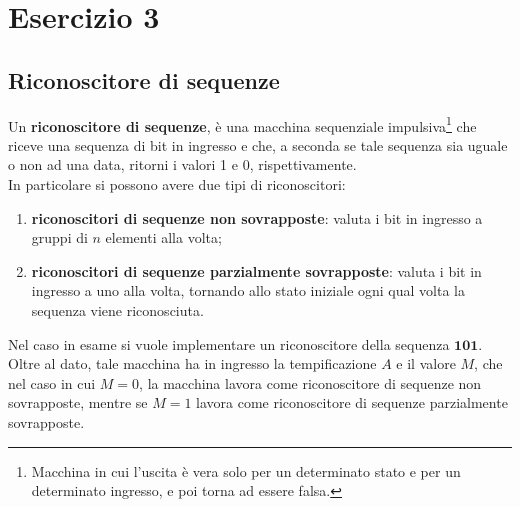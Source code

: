 \chapter{Esercizio 3}
\section{Riconoscitore di sequenze}
Un \textbf{riconoscitore di sequenze}, è una macchina sequenziale impulsiva\footnote{Macchina in cui l'uscita è vera solo per un determinato stato e per un determinato ingresso, e poi torna ad essere falsa.} che riceve una sequenza di bit in ingresso e che, a seconda se tale sequenza sia uguale o non ad una data, ritorni i valori 1 e 0, rispettivamente.\\
In particolare si possono avere due tipi di riconoscitori:
\begin{enumerate}
    \item \textbf{riconoscitori di sequenze non sovrapposte}: valuta i bit in ingresso a gruppi di $n$ elementi alla volta;
    \item \textbf{riconoscitori di sequenze parzialmente sovrapposte}: valuta i bit in ingresso a uno alla volta, tornando allo stato iniziale ogni qual volta la sequenza viene riconosciuta.
\end{enumerate}

\noindent Nel caso in esame si vuole implementare un riconoscitore della sequenza $\mathbf{101}$.\\
Oltre al dato, tale macchina ha in ingresso la tempificazione $A$ e il valore $M$, che nel caso in cui $M=0$, la macchina lavora come riconoscitore di sequenze non sovrapposte, mentre se $M=1$ lavora come  riconoscitore di sequenze parzialmente sovrapposte.

